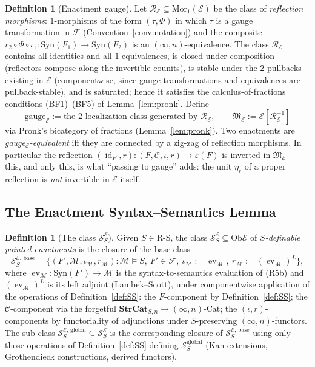 \documentclass[11pt]{article}
\theoremstyle{plain}
\theoremstyle{definition}
\newtheorem{definition}[theorem]{Definition}
\newcommand{\RS}{\mathrm{R\text{-}S}}
\newcommand{\cS}{\mathcal{S}}
\newcommand{\cF}{\mathcal{F}}
\newcommand{\cM}{\mathcal{M}}
\newcommand{\cC}{\mathcal{C}}
\newcommand{\fM}{\mathfrak{M}}
\newcommand{\Ob}{\mathrm{Ob}}
\newcommand{\Mor}{\mathrm{Mor}}
\newcommand{\Cat}{\mathrm{Cat}}
\newcommand{\Syn}{\mathrm{Syn}}
\newcommand{\cE}{\mathcal{E}}
\newcommand{\SSE}{\cS_{S}^{\cE}}
\newcommand{\SSEbase}{\cS_{S}^{\cE,\,\mathrm{base}}}
\newcommand{\SSEglobal}{\cS_{S}^{\cE,\,\mathrm{global}}}
\DeclareMathOperator{\id}{id}
\DeclareMathOperator{\ev}{ev}
\begin{document}
\begin{definition}[Enactment gauge]\label{def:gauge-E}
Let $\mathcal{R}_\cE \subseteq \Mor_1(\cE)$ be the class of \emph{reflection morphisms}: $1$-morphisms of the form $(\tau, \Phi)$ in which $\tau$ is a gauge transformation in $\cF$ (Convention~\ref{conv:notation}) and the composite $r_2 \circ \Phi \circ \iota_1 : \Syn(F_1) \to \Syn(F_2)$ is an $(\infty, n)$-equivalence. The class $\mathcal{R}_\cE$ contains all identities and all $1$-equivalences, is closed under composition (reflectors compose along the invertible counits), is stable under the $2$-pullbacks existing in $\cE$ (componentwise, since gauge transformations and equivalences are pullback-stable), and is saturated; hence it satisfies the calculus-of-fractions conditions (BF1)--(BF5) of Lemma~\ref{lem:pronk}. Define
\[ \mathrm{gauge}_\cE := \text{the $2$-localization class generated by } \mathcal{R}_\cE, \qquad \fM_\cE := \cE[\mathcal{R}_\cE^{-1}] \]
via Pronk's bicategory of fractions (Lemma~\ref{lem:pronk}). Two enactments are \emph{gauge$_\cE$-equivalent} iff they are connected by a zig-zag of reflection morphisms. In particular the reflection $(\id_F, r) : (F, \cC, \iota, r) \to \varepsilon(F)$ is inverted in $\fM_\cE$ --- this, and only this, is what ``passing to gauge'' adds: the unit $\eta_r$ of a proper reflection is \emph{not} invertible in $\cE$ itself.
\end{definition}

\subsection{The Enactment Syntax--Semantics Lemma}

\begin{definition}[The class $\SSE$]\label{def:SSE}
Given $S \in \RS$, the class $\SSE \subseteq \Ob \cE$ of \emph{$S$-definable pointed enactments} is the closure of the base class
\[
  \SSEbase = \bigl\{ (F', \cM, \iota_\cM, r_\cM) : \cM \models S,\ F' \in \cF,\ \iota_\cM := \ev_\cM,\ r_\cM := (\ev_\cM)^L \bigr\},
\]
where $\ev_\cM : \Syn(F') \to \cM$ is the syntax-to-semantics evaluation of (R5b) and $(\ev_\cM)^L$ is its left adjoint (Lambek--Scott), under componentwise application of the operations of Definition~\ref{def:SS}: the $F$-component by Definition~\ref{def:SS}; the $\cC$-component via the forgetful $\mathbf{StrCat}_{S, n} \to (\infty, n)\text{-}\Cat$; the $(\iota, r)$-components by functoriality of adjunctions under $S$-preserving $(\infty, n)$-functors. The sub-class $\SSEglobal \subseteq \SSE$ is the corresponding closure of $\SSEbase$ using only those operations of Definition~\ref{def:SS} defining $\cS_S^{\mathrm{global}}$ (Kan extensions, Grothendieck constructions, derived functors).
\end{definition}
\end{document}
